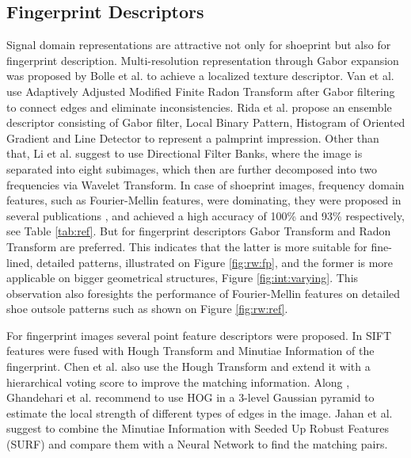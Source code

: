 \documentclass[draft,final]{vutinfth} %
\begin{document}
\subsection{Fingerprint Descriptors}
\par
Signal domain representations are attractive not only for shoeprint but also for fingerprint description.
Multi-resolution representation through Gabor expansion was proposed by Bolle et al. \cite{bolle2012fingerprint} to achieve a localized texture descriptor.
Van et al. \cite{van2016fingerprint} use Adaptively Adjusted Modified Finite Radon Transform after Gabor filtering to connect edges and eliminate inconsistencies.
Rida et al. \cite{rida2018palmprint} propose an ensemble descriptor consisting of Gabor filter, Local Binary Pattern, Histogram of Oriented Gradient and Line Detector to represent a palmprint impression.
Other than that, Li et al. \cite{li2012texture} suggest to use Directional Filter Banks, where the image is separated into eight subimages, which then are further decomposed into two frequencies via Wavelet Transform.
In case of shoeprint images, frequency domain features, such as Fourier-Mellin features, were dominating, they were proposed in several publications  \cite{gueham2007automatic}, \cite{wu2019crime} and achieved a high accuracy of 100\% and 93\% respectively, see Table \ref{tab:ref}.
But for fingerprint descriptors Gabor Transform and Radon Transform are preferred.
This indicates that the latter is more suitable for fine-lined, detailed patterns, illustrated on Figure \ref{fig:rw:fp}, and the former is more applicable on bigger geometrical structures, Figure \ref{fig:int:varying}.
This observation also foresights the performance of Fourier-Mellin features on detailed shoe outsole patterns such as shown on Figure \ref{fig:rw:ref}. 
\par
For fingerprint images several point feature descriptors were proposed.
In \cite{zhou2011adaptive} SIFT \cite{lowe1999object} features were fused with Hough Transform and Minutiae Information of the fingerprint.
Chen et al. \cite{chen2013hierarchical} also use the Hough Transform and extend it with a hierarchical voting score to improve the matching information. 
Along  \cite{rida2018palmprint}, Ghandehari et al. \cite{ghandehari2012palmprint} recommend to use HOG in a 3-level Gaussian pyramid to estimate the local strength of different types of edges in the image.
Jahan et al. \cite{jahan2017robust} suggest to combine the Minutiae Information with Seeded Up Robust Features (SURF) and compare them with a Neural Network to find the matching pairs.
\end{document}
